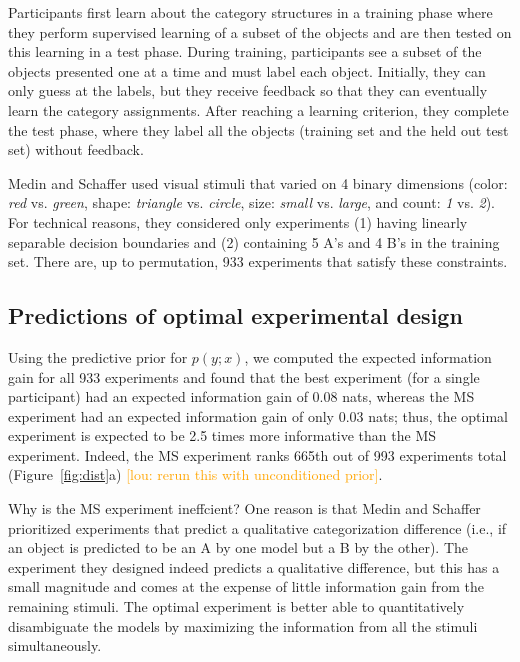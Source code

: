\documentclass{article}
\newcommand{\lou}[1]{\textcolor{orange}{[lou: #1]}}
\begin{document}
Participants first learn about the category structures in a training phase where they perform supervised learning of a subset of the objects and are then tested on this learning in a test phase.
During training, participants see a subset of the objects presented one at a time and must label each object.
Initially, they can only guess at the labels, but they receive feedback so that they can eventually learn the category assignments.
After reaching a learning criterion, they complete the test phase, where they label all the objects (training set and the held out test set) without feedback.

Medin and Schaffer used visual stimuli that varied on 4 binary dimensions (color: \emph{red} vs. \emph{green}, shape: \emph{triangle} vs. \emph{circle}, size: \emph{small} vs. \emph{large}, and count: \emph{1} vs. \emph{2}).
For technical reasons, they considered only experiments (1) having linearly separable decision boundaries and (2) containing 5 A's and 4 B's in the training set.
There are, up to permutation, 933 experiments that satisfy these constraints.

\subsection{Predictions of optimal experimental design}

Using the predictive prior for $p(y; x)$, we computed the expected information gain for all 933 experiments and found that the best experiment (for a single participant) had an expected information gain of 0.08 nats, whereas the MS experiment had an expected information gain of only 0.03 nats; thus, the optimal experiment is expected to be 2.5 times more informative than the MS experiment.
Indeed, the MS experiment ranks 665th out of 993 experiments total (Figure~\ref{fig:dist}a) \lou{rerun this with unconditioned prior}.

Why is the MS experiment ineffcient?
One reason is that Medin and Schaffer prioritized experiments that predict a qualitative categorization difference (i.e., if an object is predicted to be an A by one model but a B by the other).
The experiment they designed indeed predicts a qualitative difference, but this has a small magnitude and comes at the expense of little information gain from the remaining stimuli.
The optimal experiment is better able to quantitatively disambiguate the models by maximizing the information from all the stimuli simultaneously.
\end{document}
